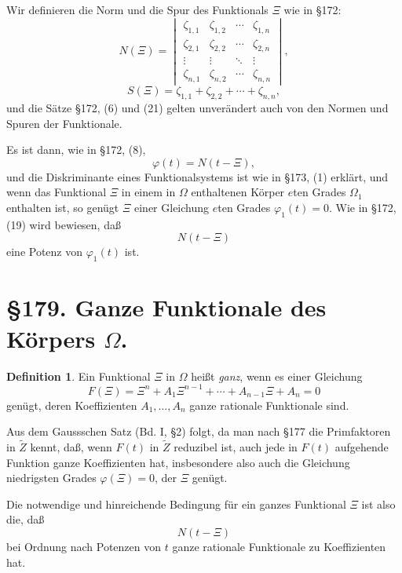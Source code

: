 \documentclass[12pt,a4paper]{article}
\theoremstyle{definition}
\newtheorem{defin}{Definition}[section]
\begin{document}
Wir definieren die Norm und die Spur des Funktionals $\Xi$ wie in \S 172:
\begin{equation}
N(\Xi) = \begin{vmatrix}
\zeta_{1,1} & \zeta_{1,2} & \cdots & \zeta_{1,n} \\
\zeta_{2,1} & \zeta_{2,2} & \cdots & \zeta_{2,n} \\
\vdots & \vdots & \ddots & \vdots \\
\zeta_{n,1} & \zeta_{n,2} & \cdots & \zeta_{n,n}
\end{vmatrix},
\end{equation}
\begin{equation}
S(\Xi) = \zeta_{1,1} + \zeta_{2,2} + \cdots + \zeta_{n,n},
\end{equation}
und die Sätze \S 172, (6) und (21) gelten unverändert auch von den Normen und Spuren der Funktionale.

Es ist dann, wie in \S 172, (8),
\begin{equation}
\varphi(t) = N(t - \Xi),
\end{equation}
und die Diskriminante eines Funktionalsystems ist wie in \S 173, (1) erklärt, und wenn das Funktional $\Xi$ in einem in $\Omega$ enthaltenen Körper $e$ten Grades $\Omega_1$ enthalten ist, so genügt $\Xi$ einer Gleichung $e$ten Grades $\varphi_1(t) = 0$. Wie in \S 172, (19) wird bewiesen, daß
\[N(t - \Xi)\]
eine Potenz von $\varphi_1(t)$ ist.

\newpage
\section*{\S 179. Ganze Funktionale des Körpers $\Omega$.}

\begin{defin}
Ein Funktional $\Xi$ in $\Omega$ heißt \emph{ganz}, wenn es einer Gleichung
\[F(\Xi) = \Xi^n + A_1\Xi^{n-1} + \cdots + A_{n-1}\Xi + A_n = 0\]
genügt, deren Koeffizienten $A_1, \ldots, A_n$ ganze rationale Funktionale sind.
\end{defin}

Aus dem Gaussschen Satz (Bd. I, \S 2) folgt, da man nach \S 177 die Primfaktoren in $\tilde{Z}$ kennt, daß, wenn $F(t)$ in $\tilde{Z}$ reduzibel ist, auch jede in $F(t)$ aufgehende Funktion ganze Koeffizienten hat, insbesondere also auch die Gleichung niedrigsten Grades $\varphi(\Xi) = 0$, der $\Xi$ genügt.

Die notwendige und hinreichende Bedingung für ein ganzes Funktional $\Xi$ ist also die, daß
\[N(t - \Xi)\]
bei Ordnung nach Potenzen von $t$ ganze rationale Funktionale zu Koeffizienten hat.
\end{document}
